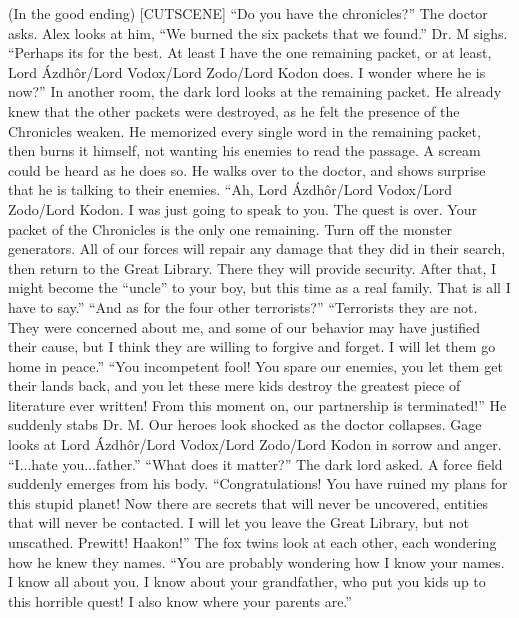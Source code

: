 \documentclass{gd-document}
\begin{document}
\begin{enumerate}
\begin{enumerate}
      (In the good ending) [CUTSCENE] “Do you have the chronicles?”
      The doctor asks. Alex looks at him, “We burned the six packets
      that we found.” Dr. M sighs. “Perhaps its for the best. At least
      I have the one remaining packet, or at least, Lord Ázdhôr/Lord
      Vodox/Lord Zodo/Lord Kodon does. I wonder where he is now?” In
      another room, the dark lord looks at the remaining packet. He
      already knew that the other packets were destroyed, as he felt
      the presence of the Chronicles weaken. He memorized every single
      word in the remaining packet, then burns it himself, not wanting
      his enemies to read the passage. A scream could be heard as he
      does so. He walks over to the doctor, and shows surprise that he
      is talking to their enemies. “Ah, Lord Ázdhôr/Lord Vodox/Lord
      Zodo/Lord Kodon. I was just going to speak to you. The quest is
      over. Your packet of the Chronicles is the only one
      remaining. Turn off the monster generators. All of our forces
      will repair any damage that they did in their search, then
      return to the Great Library. There they will provide
      security. After that, I might become the “uncle” to your boy,
      but this time as a real family. That is all I have to say.” “And
      as for the four other terrorists?” “Terrorists they are
      not. They were concerned about me, and some of our behavior may
      have justified their cause, but I think they are willing to
      forgive and forget. I will let them go home in peace.” “You
      incompetent fool! You spare our enemies, you let them get their
      lands back, and you let these mere kids destroy the greatest
      piece of literature ever written! From this moment on, our
      partnership is terminated!” He suddenly stabs Dr. M. Our heroes
      look shocked as the doctor collapses. Gage looks at Lord
      Ázdhôr/Lord Vodox/Lord Zodo/Lord Kodon in sorrow and
      anger. “I...hate you...father.” “What does it matter?” The dark
      lord asked. A force field suddenly emerges from his
      body. “Congratulations! You have ruined my plans for this stupid
      planet! Now there are secrets that will never be uncovered,
      entities that will never be contacted. I will let you leave the
      Great Library, but not unscathed. Prewitt! Haakon!” The fox
      twins look at each other, each wondering how he knew they
      names. “You are probably wondering how I know your names. I know
      all about you. I know about your grandfather, who put you kids
      up to this horrible quest! I also know where your parents are.”

\end{enumerate}
\end{enumerate}
\end{document}
